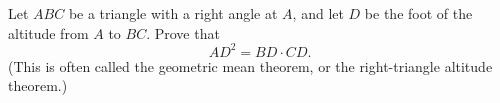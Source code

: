 Let $ABC$ be a triangle with a right angle at $A$, and let $D$ be the foot of the altitude from $A$ to $BC$. Prove that
\[
AD^2=BD\cdot CD .
\]
(This is often called the geometric mean theorem, or the right-triangle altitude theorem.)
